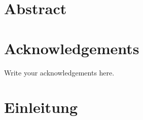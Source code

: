 \documentclass[a4paper,UKenglish,compactauthor]{lipics-v2021}
\begin{document}

\setcounter{page}{1}


\section*{Abstract}

\newpage

\section*{Acknowledgements}

Write your acknowledgements here.

\cleardoublepage



\small\normalsize
{} %
\tableofcontents
{}


\small\normalsize

\cleardoublepage



\setcounter{page}{1}

\section{Einleitung}
\label{sec:introduction}

\end{document}
